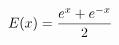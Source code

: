 \documentclass[preview]{standalone}
\begin{document}
\begin{align*}
\special{dvisvgm:raw <g id='unique000'>}E(x)=\frac{e^x+e^{-x}}{2}\special{dvisvgm:raw </g>}
\end{align*}
\end{document}
